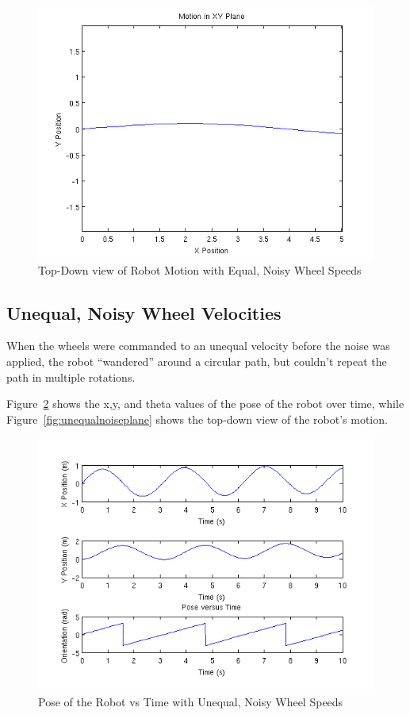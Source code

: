 \documentclass[10pt]{article}
\begin{document}
\begin{figure}[h]
 \centering
 \includegraphics[scale=0.55,keepaspectratio=true]{equalnoiseplane.png}
 \caption{Top-Down view of Robot Motion with Equal, Noisy Wheel Speeds}
 \label{fig:equalnoiseplane}
\end{figure}


\newpage
\subsection{Unequal, Noisy Wheel Velocities}
When the wheels were commanded to an unequal velocity before the noise was applied, the robot ``wandered'' around a circular path, but couldn't repeat the path in multiple rotations.

Figure~\ref{fig:unequalnoisepose} shows the x,y, and theta values of the pose of the robot over time, while Figure~\ref{fig:unequalnoiseplane} shows the top-down view of the robot's motion.

\begin{figure}[h]
 \centering
 \includegraphics[scale=0.55,keepaspectratio=true]{unequalnoisepose.png}
 \caption{Pose of the Robot vs Time with Unequal, Noisy Wheel Speeds}
 \label{fig:unequalnoisepose}
\end{figure}
\end{document}
